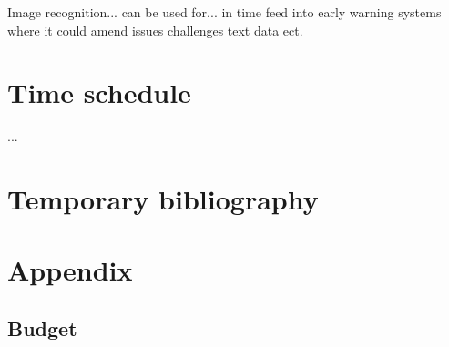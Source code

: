 \documentclass[a4paper]{article}
\begin{document}
Image recognition... can be used for... in time feed into early warning systems where it could amend issues challenges text data ect.





\section{Time schedule} 
...

\section{Temporary bibliography}
 


\pagebreak
\section{Appendix}

\subsection{Budget}
\end{document}
